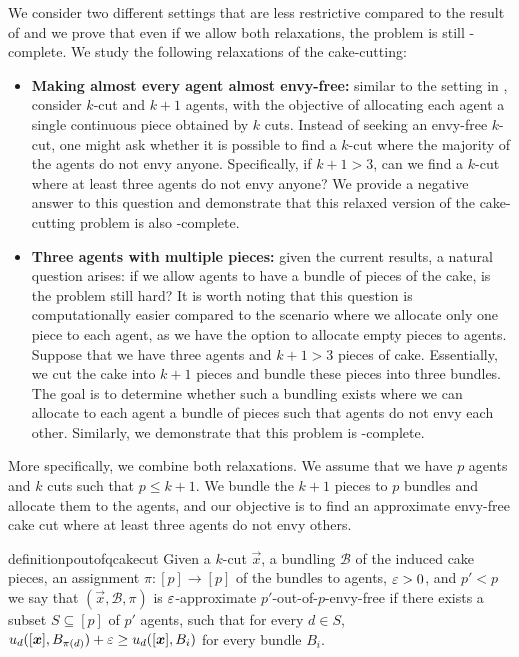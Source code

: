 We consider two different settings that are less restrictive compared to the result of  and we prove that even if we allow both relaxations, the problem is still \PPAD-complete. We study the following relaxations of the cake-cutting:
\begin{itemize}

    \item \textbf{Making almost every agent almost envy-free:} similar to the setting in \cite{DBLP:journals/ior/DengQS12}, consider $k$-cut and $k + 1$ agents, with the objective of allocating each agent a single continuous piece obtained by $k$ cuts. Instead of seeking an envy-free $k$-cut, one might ask whether it is possible to find a $k$-cut where the majority of the agents do not envy anyone. Specifically, if $k + 1 > 3$, can we find a $k$-cut where at least three agents do not envy anyone? We provide a negative answer to this question and demonstrate that this relaxed version of the cake-cutting problem is also \PPAD-complete. 
    
    
    \item \textbf{Three agents with multiple pieces:} given the current results, a natural question arises: if we allow agents to have a bundle of pieces of the cake, is the problem still hard? It is worth noting that this question is computationally easier compared to the scenario where we allocate only one piece to each agent, as we have the option to allocate empty pieces to agents. Suppose that we have three agents and $k + 1 > 3$ pieces of cake. Essentially, we cut the cake into $k + 1$ pieces and bundle these pieces into three bundles. The goal is to determine whether such a bundling exists where we can allocate to each agent a bundle of pieces such that agents do not envy each other. Similarly, we demonstrate that this problem is \PPAD-complete. 
\end{itemize}

More specifically, we combine both relaxations. We assume that we have $p$ agents and $k$ cuts such that $p \leq k + 1$. We bundle the $k + 1$ pieces to $p$ bundles and allocate them to the agents, and our objective is to find an approximate envy-free cake cut where at least three agents do not envy others. 


\begin{restatable}{definition}{poutofqcakecut}
    Given a $k$-cut $\vec{x}$, a bundling $\mathcal{B}$ of the induced cake pieces, an assignment $\pi: [p] \rightarrow [p]$ of the bundles to agents, $\varepsilon>0$, and $p' < p$ we say that  $(\vec{x}, \mathcal{B}, \pi)$ is  $\varepsilon$-approximate $p'$-out-of-$p$-envy-free if there exists a subset $S \subseteq [p]$ of $p'$ agents, such that for every $d \in S$, $u_d([\boldsymbol{x}], B_{\pi(d)}) + \varepsilon \geq u_d([\boldsymbol{x}], B_i)$  for every bundle $B_i$. 
\end{restatable}


